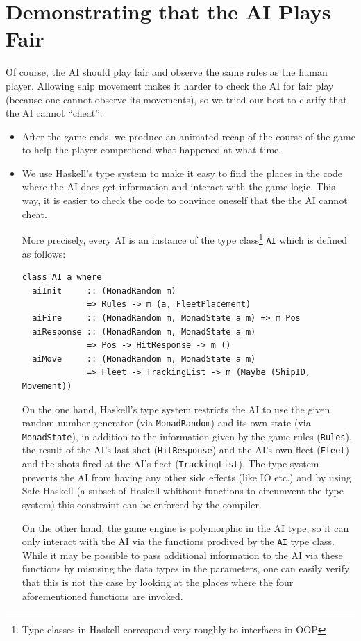 \documentclass[a4paper]{easychair}
\begin{document}
\section{Demonstrating that the AI Plays Fair}
\label{sect:fair-play}
Of course, the AI should play fair and observe the same rules as the human player. Allowing ship movement makes it harder to check the AI for fair play (because one cannot observe its movements), so we tried our best to clarify that the AI cannot ``cheat'':

\begin{itemize}
\item After the game ends, we produce an animated recap of the course of the game to help the player comprehend what happened at what time. 
\item We use Haskell's type system to make it easy to find the places in the code where the AI does get information and interact with the game logic. This way, it is easier to check the code to convince oneself that the the AI cannot cheat.
  
More precisely, every AI is an instance of the type class\footnote{Type classes in Haskell correspond very roughly to interfaces in OOP} \verb+AI+ which is defined as follows:

\begin{verbatim}
class AI a where
  aiInit     :: (MonadRandom m) 
             => Rules -> m (a, FleetPlacement)
  aiFire     :: (MonadRandom m, MonadState a m) => m Pos
  aiResponse :: (MonadRandom m, MonadState a m) 
             => Pos -> HitResponse -> m ()
  aiMove     :: (MonadRandom m, MonadState a m)
             => Fleet -> TrackingList -> m (Maybe (ShipID, Movement))
\end{verbatim}

On the one hand, Haskell's type system restricts the AI to use the given random number generator (via \verb|MonadRandom|) and its own state (via \verb|MonadState|), in addition to the information given by the game rules (\verb|Rules|), the result of the AI's last shot (\verb|HitResponse|) and the AI's own fleet (\verb|Fleet|) and the shots fired at the AI's fleet (\verb|TrackingList|).
The type system prevents the AI from having any other side effects (like IO etc.) and by using Safe Haskell (a subset of Haskell whithout functions to circumvent the type system) this constraint can be enforced by the compiler.

On the other hand, the game engine is polymorphic in the AI type, so it can only interact with the AI via the functions prodived by the \verb|AI| type class. While it may be possible to pass additional information to the AI via these functions by misusing the data types in the parameters, one can easily verify that this is not the case by looking at the places where the four aforementioned functions are invoked.

\end{itemize}
\end{document}
